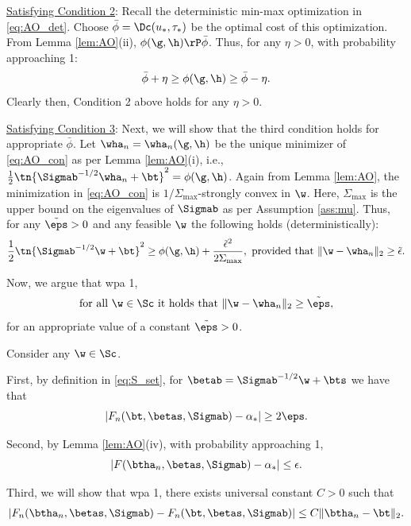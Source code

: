 \vspace{5pt}
\noindent\underline{Satisfying Condition 2}: Recall the deterministic min-max optimization in \eqref{eq:AO_det}. Choose $\bar\phi=\Dc(u_*,\tau_*)$ be the optimal cost of this optimization. From Lemma \ref{lem:AO}(ii), $\phi(\g,\h)\rP\bar\phi$. Thus, for any $\eta>0$, with probability approaching 1:
\begin{align}\label{eq:phi_lim}
\bar\phi + \eta \geq \phi(\g,\h) \geq \bar\phi - \eta.
\end{align}
Clearly then, Condition 2 above holds for any $\eta>0$. 

\vspace{5pt}
\noindent\underline{Satisfying Condition 3}: Next, we will show that the third condition holds for appropriate $\bar\phi$. 
Let $\wha_n=\wha_n(\g,\h)$ be the unique minimizer of \eqref{eq:AO_con} as per Lemma \ref{lem:AO}(i), i.e., $\frac{1}{2}\tn{\Sigmab^{-1/2}\wha_n+\bt}^2 = \phi(\g,\h)$. Again from Lemma \ref{lem:AO}, the minimization in \eqref{eq:AO_con} is $1/\Sigma_{\max}$-strongly convex in $\w$. Here, $\Sigma_{\max}$ is the upper bound on the eigenvalues of $\Sigmab$ as per Assumption \ref{ass:mu}. Thus, for any $\tilde\eps>0$ and any feasible $\w$ the following holds (deterministically):
\begin{align}\label{eq:sc}
\frac{1}{2}\tn{\Sigmab^{-1/2}\w+\bt}^2 \geq \phi(\g,\h) + \frac{\tilde\epsilon^2}{2{\Sigma_{\max}}},~\text{provided that}~ \|\w-\wha_n\|_2 \geq \tilde\epsilon.
\end{align}

Now, we argue that {wpa 1,}
\begin{align}\label{eq:dev_arg}
\text{for all}~\w\in \Sc~\text{it holds that}~\|\w-\wha_n\|_2\geq \tilde\eps,
\end{align}
for an appropriate value of a constant $\tilde\eps>0$.

 Consider any $\w\in\Sc$. 

 First, by definition in \eqref{eq:S_set}, for $\betab=\Sigmab^{-1/2}\w+\bts$ we have that
$$
|F_n(\bt,\betas,\Sigmab)-\alpha_*| \geq 2\eps.
$$

Second, by Lemma \ref{lem:AO}(iv), with probability approaching 1,
$$
|F(\btha_n,\betas,\Sigmab) - \alpha_*| \leq \epsilon.
$$

Third, we will show that wpa 1, there exists universal constant $C>0$ such that
\begin{align}
|F_n(\btha_n,\betas,\Sigmab) - F_n(\bt,\betas,\Sigmab)| \leq C {\|\btha_n - \bt\|_2}\label{eq:dev2show}.
\end{align}

